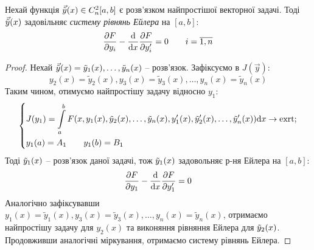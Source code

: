 \begin{boxteo}
 Нехай функція  $\vec{\tilde{y}} (x) \in C_n^2 [a,b]$ є розв'язком найпростішої векторної задачі. Тоді $\vec{\tilde{y}} (x)$ задовільняє
 \textit{систему рівнянь Ейлера} на $[a,b]$:
 $$
 \frac{\partial F}{\partial y_i } - \frac{\mathrm{d}}{\mathrm{d} x} \frac{\partial F}{\partial y_i'} = 0 \qquad i = \overline{1, n}
 $$
\end{boxteo}
\begin{proof}
 Нехай $\vec{\tilde{y}}(x) = \tilde{y}_1 (x),  \dots , \tilde{y}_n (x)$ -- розв'язок. Зафіксуємо в $J(\overrightarrow{y})$:
 $$
 y_2 (x) = \tilde{y}_2(x), y_3 (x) = \tilde{y}_3(x), \dots , y_n (x) = \tilde{y}_n(x)
 $$
 Таким чином, отимуємо найпростішу задачу відносно $y_1$:
 $$
 \begin{dcases}
  J(y_1) =  \int\limits_{a}^{ b}{F(x, y_1(x), \tilde{y}_2(x), \dots, \tilde{y}_n(x), y_1'(x), \tilde{y}_2'(x), \dots, \tilde{y}_n'(x))} \mathrm{d} x \to \mathrm{exrt};\\
  y_1(a) = A_1 \qquad y_1 (b) = B_1
 \end{dcases}
 $$
 Тоді $\tilde{y}_1(x)$ -- розв'язок даної задачі, тож $\tilde{y}_1(x)$  задовольняє р-ня Ейлера на $[a,b]$:
 $$
 \frac{\partial F}{\partial y_1} - \frac{\mathrm{d}}{ \mathrm{d} x} \frac{\partial F}{\partial y_1'} = 0
 $$
 Аналогічно зафіксувавши $ y_1 (x) = \tilde{y}_1(x), y_3 (x) = \tilde{y}_3(x), \dots , y_n (x) = \tilde{y}_n(x)$,  отримаємо найпростішу задачу для $y_2(x)$ та виконяння рівняння Ейлера для $\tilde{y}_2 (x)$. Продовживши аналогічні міркування, отримаємо систему рівнянь Ейлера.
\end{proof}
\newpage
